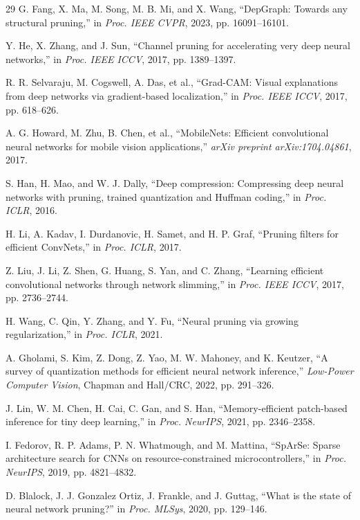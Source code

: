 \documentclass{jcse}
\begin{document}
\begin{thebibliography}{29}
G. Fang, X. Ma, M. Song, M. B. Mi, and X. Wang, ``DepGraph: Towards any structural pruning,'' in \textit{Proc. IEEE CVPR}, 2023, pp. 16091--16101.

Y. He, X. Zhang, and J. Sun, ``Channel pruning for accelerating very deep neural networks,'' in \textit{Proc. IEEE ICCV}, 2017, pp. 1389--1397.

R. R. Selvaraju, M. Cogswell, A. Das, et al., ``Grad-CAM: Visual explanations from deep networks via gradient-based localization,'' in \textit{Proc. IEEE ICCV}, 2017, pp. 618--626.

A. G. Howard, M. Zhu, B. Chen, et al., ``MobileNets: Efficient convolutional neural networks for mobile vision applications,'' \textit{arXiv preprint arXiv:1704.04861}, 2017.

S. Han, H. Mao, and W. J. Dally, ``Deep compression: Compressing deep neural networks with pruning, trained quantization and Huffman coding,'' in \textit{Proc. ICLR}, 2016.

H. Li, A. Kadav, I. Durdanovic, H. Samet, and H. P. Graf, ``Pruning filters for efficient ConvNets,'' in \textit{Proc. ICLR}, 2017.

Z. Liu, J. Li, Z. Shen, G. Huang, S. Yan, and C. Zhang, ``Learning efficient convolutional networks through network slimming,'' in \textit{Proc. IEEE ICCV}, 2017, pp. 2736--2744.

H. Wang, C. Qin, Y. Zhang, and Y. Fu, ``Neural pruning via growing regularization,'' in \textit{Proc. ICLR}, 2021.

A. Gholami, S. Kim, Z. Dong, Z. Yao, M. W. Mahoney, and K. Keutzer, ``A survey of quantization methods for efficient neural network inference,'' \textit{Low-Power Computer Vision}, Chapman and Hall/CRC, 2022, pp. 291--326.

J. Lin, W. M. Chen, H. Cai, C. Gan, and S. Han, ``Memory-efficient patch-based inference for tiny deep learning,'' in \textit{Proc. NeurIPS}, 2021, pp. 2346--2358.

I. Fedorov, R. P. Adams, P. N. Whatmough, and M. Mattina, ``SpArSe: Sparse architecture search for CNNs on resource-constrained microcontrollers,'' in \textit{Proc. NeurIPS}, 2019, pp. 4821--4832.

D. Blalock, J. J. Gonzalez Ortiz, J. Frankle, and J. Guttag, ``What is the state of neural network pruning?'' in \textit{Proc. MLSys}, 2020, pp. 129--146.


\end{thebibliography}
\end{document}
